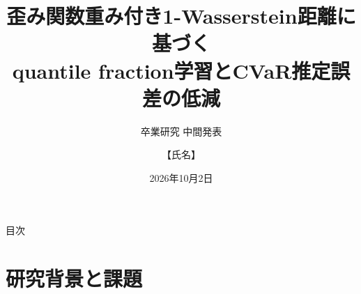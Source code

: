 \documentclass[aspectratio=169, 11pt]{beamer}
\title[歪み重み付き1-Wasserstein距離によるquantile fraction学習]{歪み関数重み付き1-Wasserstein距離に基づく\\quantile fraction学習とCVaR推定誤差の低減}
\subtitle{卒業研究 中間発表}
\author{【氏名】}
\institute{【研究室名】 \quad 指導教員：【指導教員名】}
\date{2026年10月2日}
\begin{document}
\begin{frame}[plain]
  \titlepage
\end{frame}

\begin{frame}{目次}
  \tableofcontents
\end{frame}

\section{研究背景と課題}
\end{document}
